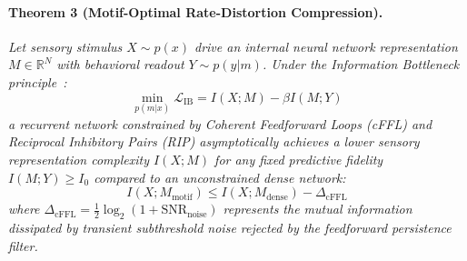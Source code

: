 \documentclass[11pt,letterpaper]{report}
\begin{document}
\paragraph{Theorem 3 (Motif-Optimal Rate-Distortion Compression).}
\textit{Let sensory stimulus $X \sim p(x)$ drive an internal neural network representation $M \in \mathbb{R}^N$ with behavioral readout $Y \sim p(y|m)$. Under the Information Bottleneck principle~\cite{tishby2000information}:
\begin{equation}
\min_{p(m|x)} \mathcal{L}_{\mathrm{IB}} = I(X; M) - \beta I(M; Y)
\end{equation}
a recurrent network constrained by Coherent Feedforward Loops (cFFL) and Reciprocal Inhibitory Pairs (RIP) asymptotically achieves a lower sensory representation complexity $I(X; M)$ for any fixed predictive fidelity $I(M; Y) \ge I_0$ compared to an unconstrained dense network:
\begin{equation}
I(X; M_{\mathrm{motif}}) \le I(X; M_{\mathrm{dense}}) - \Delta_{\mathrm{cFFL}}
\end{equation}
where $\Delta_{\mathrm{cFFL}} = \frac{1}{2}\log_2(1 + \mathrm{SNR}_{\mathrm{noise}})$ represents the mutual information dissipated by transient subthreshold noise rejected by the feedforward persistence filter.}
\end{document}
